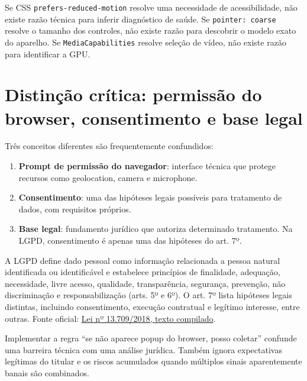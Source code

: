 \documentclass[11pt,a4paper]{article}
\begin{document}
\begin{goodBox}
Se CSS \texttt{prefers-reduced-motion} resolve uma necessidade de acessibilidade, não existe razão técnica para inferir diagnóstico de saúde. Se \texttt{pointer: coarse} resolve o tamanho dos controles, não existe razão para descobrir o modelo exato do aparelho. Se \texttt{MediaCapabilities} resolve seleção de vídeo, não existe razão para identificar a GPU.
\end{goodBox}

\section{Distinção crítica: permissão do browser, consentimento e base legal}
Três conceitos diferentes são frequentemente confundidos:
\begin{enumerate}
\item \textbf{Prompt de permissão do navegador}: interface técnica que protege recursos como geolocation, camera e microphone.
\item \textbf{Consentimento}: uma das hipóteses legais possíveis para tratamento de dados, com requisitos próprios.
\item \textbf{Base legal}: fundamento jurídico que autoriza determinado tratamento. Na LGPD, consentimento é apenas uma das hipóteses do art. 7º.
\end{enumerate}

A LGPD define dado pessoal como informação relacionada a pessoa natural identificada ou identificável e estabelece princípios de finalidade, adequação, necessidade, livre acesso, qualidade, transparência, segurança, prevenção, não discriminação e responsabilização (arts. 5º e 6º). O art. 7º lista hipóteses legais distintas, incluindo consentimento, execução contratual e legítimo interesse, entre outras. Fonte oficial: \href{https://www.planalto.gov.br/ccivil_03/_ato2015-2018/2018/lei/l13709.htm}{Lei nº 13.709/2018, texto compilado}.

\begin{riskBox}
Implementar a regra ``se não aparece popup do browser, posso coletar'' confunde uma barreira técnica com uma análise jurídica. Também ignora expectativas legítimas do titular e os riscos acumulados quando múltiplos sinais aparentemente banais são combinados.
\end{riskBox}
\end{document}
